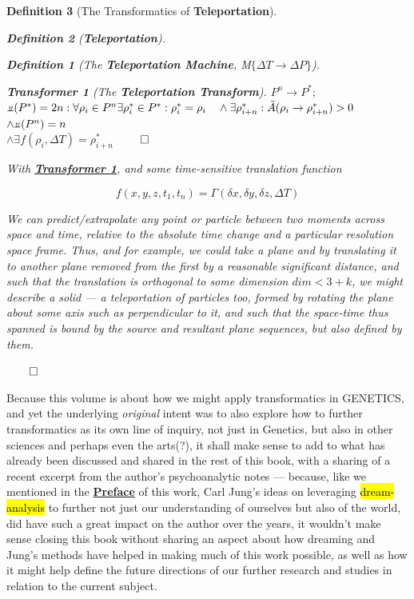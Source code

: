 \documentclass[a4paper, 18pt]{book} %
\newtheorem{defn}{Definition}
\newtheorem{transf}{Transformer}
\newcommand{\invpi}{\rotatebox[origin=c]{180}{$\pi$}}
\begin{document}
\begin{appendices}
\begin{defn}[The Transformatics of \textbf{Teleportation}]
\begin{defn}[\textbf{Teleportation}]
\begin{defn}[The \textbf{Teleportation Machine}, M$\{\Delta T \rightarrow \Delta P\}$]
\begin{transf}[The \textbf{Teleportation Transform}]
\label{TRANSFTELEP}
$P^{n} \rightarrow P^* ;$\\
$\invpi(P^*) = 2n : \forall \rho_i \in P^n \exists \rho^*_i \in P^* : \rho^*_i = \rho_i \quad \land \exists \rho^*_{i+n} : \tilde{A}(\rho_i \rightarrow \rho^*_{i+n}) > 0$\\
$\land \invpi(P^n) = n$\\
$\land \exists f(\rho_i,\Delta T) = \rho^*_{i+n}$
$\qed$
\end{transf}
\end{defn}

\end{defn}

With \textbf{\hyperref[TRANSFTELEP]{Transformer \ref{TRANSFTELEP}}}, and some time-sensitive translation function 

\begin{equation}
f({x,y,z,t_1,t_n}) = \Gamma(\delta x,\delta y,\delta z,\Delta T)
\end{equation}

We can predict/extrapolate any point or particle between two moments across space and time, relative to the absolute time change and a particular resolution space frame. Thus, and for example, we could take a plane and by translating it to another plane removed from the first by a reasonable significant distance, and such that the translation is orthogonal to some dimension $dim < 3 + k$, we might describe a solid --- a teleportation of particles too, formed by rotating the plane about some axis such as perpendicular to it, and such that the space-time thus spanned is bound by the source and resultant plane sequences, but also defined by them.

$\qed$
\end{defn}


Because this volume is about how we might apply transformatics in GENETICS, and yet the underlying \textit{original} intent was to also explore how to further transformatics as its own line of inquiry, not just in Genetics, but also in other sciences and perhaps even the arts(?), it shall make sense to add to what has already been discussed and shared in the rest of this book, with a sharing of a recent excerpt from the author's psychoanalytic notes --- because, like we mentioned in the \textbf{\hyperref[SECPREFACE]{Preface}} of this work, Carl Jung's ideas\cite{jung1964symbols} on leveraging \hl{dream-analysis} to further not just our understanding of ourselves but also of the world, did have such a great impact on the author over the years, it wouldn't make sense closing this book without sharing an aspect about how dreaming and Jung's methods have helped in making much of this work possible, as well as how it might help define the future directions of our further research and studies in relation to the current subject. 


\end{appendices}
\end{document}
